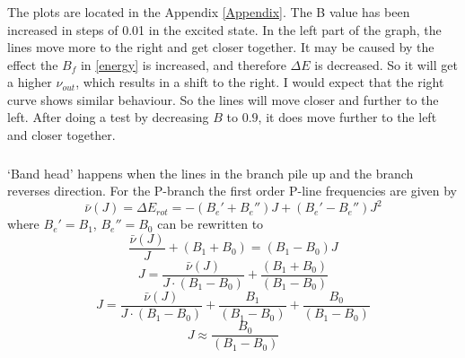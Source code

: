 \subsubsection{}  \label{ch3}
The plots are located in the Appendix \ref{Appendix}. The B value has been increased in steps of 0.01 in the excited state. In the left part of the graph, the lines move more to the right and get closer together. It may be caused by the effect the $B_f$ in \eqref{energy} is increased, and therefore $\Delta E$ is decreased. So it will get a higher $\nu _{out}$, which results in a shift to the right. I would expect that the right curve shows similar behaviour. So the lines will move closer and further to the left. After doing a test by decreasing $B$ to $0.9$, it does move further to the left and closer together. 
 
\subsubsection{}
`Band head' happens when the lines in the branch pile up and the branch reverses direction. For the P-branch the first order P-line frequencies are given by
\begin{equation}
	\bar{\nu}(J) = \Delta E_{rot} = -(B_e' + B_e'')J+(B_e'-B_e'')J^2
\end{equation}
where $B_e' = B_1$, $B_e'' = B_0$ can be rewritten to
\begin{equation*}
\frac{\bar{\nu}(J)}{J} + (B_1 + B_0) = (B_1-B_0)J 
\end{equation*}
\begin{equation*}
J = \frac{\bar{\nu}(J)}{J\cdot(B_1-B_0)}+ \frac{(B_1 + B_0)}{(B_1-B_0)}
\end{equation*}
\begin{equation*}
J = \frac{\bar{\nu}(J)}{J\cdot(B_1-B_0)}+ \frac{B_1}{(B_1-B_0)}+ \frac{B_0}{(B_1-B_0)}
\end{equation*}
\begin{equation}
	J \approx \frac{B_0}{(B_1-B_0)}
\end{equation}
